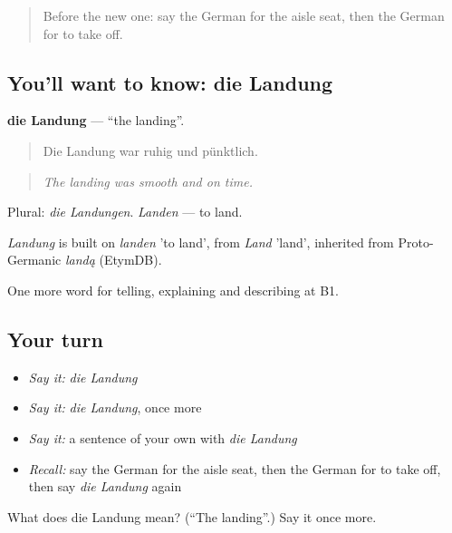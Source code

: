 \label{lesson:GE-C418-landung}



\begin{quote}
Before the new one: say the German for the aisle seat, then the German for to take off.
\end{quote}

\subsection*{You'll want to know: die Landung}
\textbf{die Landung} — \textquotedblleft{}the landing\textquotedblright{}.

\begin{quote}
Die Landung war ruhig und pünktlich.
\end{quote}

\begin{quote}
\emph{The landing was smooth and on time.}
\end{quote}

Plural: \emph{die Landungen}. \emph{Landen} — to land.

\begin{cousinweb}
\emph{Landung} is built on \emph{landen} 'to land', from \emph{Land} 'land', inherited from Proto-Germanic \emph{landą} (EtymDB).
\end{cousinweb}

\begin{grammarlens}[title={What you've built}]
One more word for telling, explaining and describing at B1.
\end{grammarlens}

\subsection*{Your turn}
\begin{itemize}
\raggedright
  \item \emph{Say it:} \emph{die Landung}
  \item \emph{Say it:} \emph{die Landung}, once more
  \item \emph{Say it:} a sentence of your own with \emph{die Landung}
  \item \emph{Recall:} say the German for the aisle seat, then the German for to take off, then say \emph{die Landung} again
\end{itemize}

\begin{tcolorbox}[breakable,colback=teal!4,colframe=teal!35!black,title={Before you move on}]
What does die Landung mean? (\textquotedblleft{}The landing\textquotedblright{}.) Say it once more.
\end{tcolorbox}

